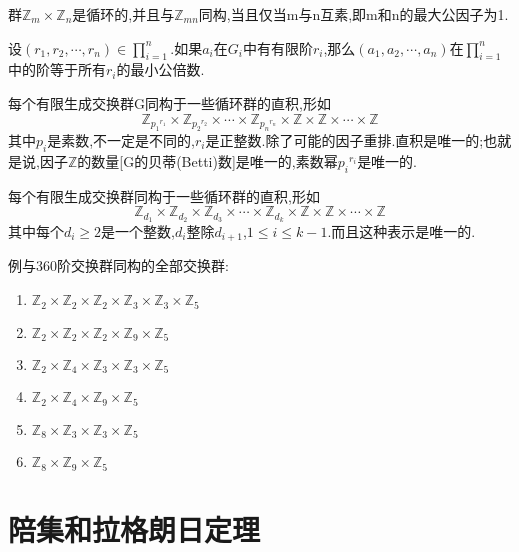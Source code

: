 \documentclass[oneside,openany]{ctexbook}
\begin{document}
\begin{definition}{}{}
群$\mathbb{Z}_m\times \mathbb{Z}_n$是循环的,并且与$\mathbb{Z}_{mn}$同构,当且仅当m与n互素,即m和n的最大公因子为1.
\end{definition}

\begin{definition}{}{}
设$(r_1,r_2,\cdots ,r_n)\in \prod ^n_{i=1}$.如果$a_i$在$G_i$中有有限阶$r_i$,那么$(a_1,a_2,\cdots ,a_n)$在$\prod ^n_{i=1}$中的阶等于所有$r_i$的最小公倍数.
\end{definition}

\begin{definition}{}{}
每个有限生成交换群G同构于一些循环群的直积,形如$$\mathbb{Z}_{{p_1}^{r_1}}\times \mathbb{Z}_{{p_2}^{r_2}}\times \cdots \times \mathbb{Z}_{{p_n}^{r_n}}\times \mathbb{Z} \times \mathbb{Z} \times \cdots \times \mathbb{Z}$$
其中$p_i$是素数,不一定是不同的,$r_i$是正整数.除了可能的因子重排.直积是唯一的;也就是说,因子$\mathbb{Z}$的数量\textnormal{[G的贝蒂(Betti)数]}是唯一的,素数幂${p_i}^{r_i}$是唯一的.
\end{definition}

\begin{definition}{}{}
每个有限生成交换群同构于一些循环群的直积,形如$$\mathbb{Z}_{d_1}\times \mathbb{Z}_{d_2}\times \mathbb{Z}_{d_3}\times \cdots \times \mathbb{Z}_{d_k}\times \mathbb{Z} \times \mathbb{Z} \times \cdots \times \mathbb{Z}$$
其中每个$d_i\geq 2$是一个整数,$d_i$整除$d_{i+1}$,$1\leq i \leq k-1$.而且这种表示是唯一的.
\end{definition}

例与360阶交换群同构的全部交换群:
\begin{enumerate}
  \item $\mathbb{Z}_2\times \mathbb{Z}_2\times \mathbb{Z}_2\times \mathbb{Z}_3\times \mathbb{Z}_3\times \mathbb{Z}_5$
  \item $\mathbb{Z}_2\times \mathbb{Z}_2\times \mathbb{Z}_2\times \mathbb{Z}_9\times \mathbb{Z}_5$
  \item $\mathbb{Z}_2\times \mathbb{Z}_4\times \mathbb{Z}_3\times \mathbb{Z}_3\times \mathbb{Z}_5$
  \item $\mathbb{Z}_2\times \mathbb{Z}_4\times \mathbb{Z}_9\times \mathbb{Z}_5$
  \item $\mathbb{Z}_8\times \mathbb{Z}_3\times \mathbb{Z}_3\times \mathbb{Z}_5$
  \item $\mathbb{Z}_8\times \mathbb{Z}_9\times \mathbb{Z}_5$
\end{enumerate}

\section{陪集和拉格朗日定理}
\end{document}
